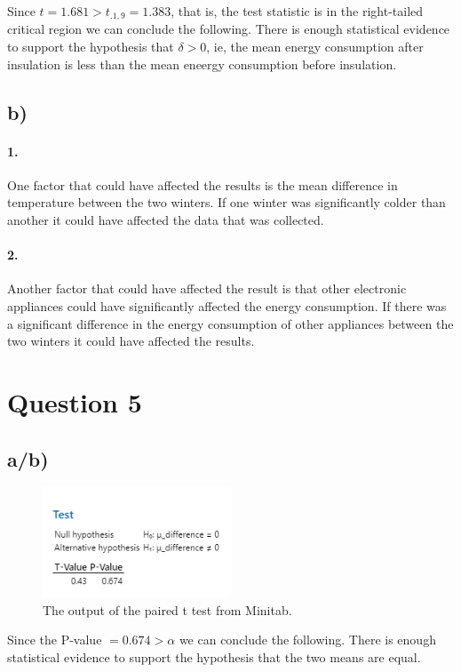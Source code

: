 \documentclass{article}
\begin{document}
Since $t = 1.681 > t_{.1,9} = 1.383$,
that is, the test statistic is in the right-tailed critical region we can conclude the following.
There is enough statistical evidence to support the hypothesis that $\delta > 0$, ie,
the mean energy consumption after insulation is less than the mean eneergy consumption before insulation.

\subsection*{b)}

\paragraph{1.} One factor that could have affected the results is the mean difference in temperature between the two winters.
If one winter was significantly colder than another it could have affected the data that was collected.

\paragraph{2.} Another factor that could have affected the result is that other electronic appliances could have significantly affected the energy consumption.
If there was a significant difference in the energy consumption of other appliances between the two winters it could have affected the results.

\clearpage
\section*{Question 5}

\subsection*{a/b)}

\begin{figure}[h]
  \centering
  \includegraphics[width=0.5\textwidth]{./images/5_a_1.png}
  \caption{The output of the paired t test from Minitab.}
  \label{fig:5_a}
\end{figure}
Since the P-value $= 0.674 > \alpha$ we can conclude the following.
There is enough statistical evidence to support the hypothesis that the two means are equal.
\end{document}

